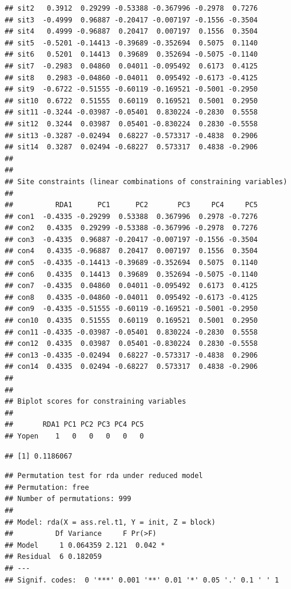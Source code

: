 \documentclass[
]{article}
\begin{document}
\begin{verbatim}
## sit2   0.3912  0.29299 -0.53388 -0.367996 -0.2978  0.7276
## sit3  -0.4999  0.96887 -0.20417 -0.007197 -0.1556 -0.3504
## sit4   0.4999 -0.96887  0.20417  0.007197  0.1556  0.3504
## sit5  -0.5201 -0.14413 -0.39689 -0.352694  0.5075  0.1140
## sit6   0.5201  0.14413  0.39689  0.352694 -0.5075 -0.1140
## sit7  -0.2983  0.04860  0.04011 -0.095492  0.6173  0.4125
## sit8   0.2983 -0.04860 -0.04011  0.095492 -0.6173 -0.4125
## sit9  -0.6722 -0.51555 -0.60119 -0.169521 -0.5001 -0.2950
## sit10  0.6722  0.51555  0.60119  0.169521  0.5001  0.2950
## sit11 -0.3244 -0.03987 -0.05401  0.830224 -0.2830  0.5558
## sit12  0.3244  0.03987  0.05401 -0.830224  0.2830 -0.5558
## sit13 -0.3287 -0.02494  0.68227 -0.573317 -0.4838  0.2906
## sit14  0.3287  0.02494 -0.68227  0.573317  0.4838 -0.2906
## 
## 
## Site constraints (linear combinations of constraining variables)
## 
##          RDA1      PC1      PC2       PC3     PC4     PC5
## con1  -0.4335 -0.29299  0.53388  0.367996  0.2978 -0.7276
## con2   0.4335  0.29299 -0.53388 -0.367996 -0.2978  0.7276
## con3  -0.4335  0.96887 -0.20417 -0.007197 -0.1556 -0.3504
## con4   0.4335 -0.96887  0.20417  0.007197  0.1556  0.3504
## con5  -0.4335 -0.14413 -0.39689 -0.352694  0.5075  0.1140
## con6   0.4335  0.14413  0.39689  0.352694 -0.5075 -0.1140
## con7  -0.4335  0.04860  0.04011 -0.095492  0.6173  0.4125
## con8   0.4335 -0.04860 -0.04011  0.095492 -0.6173 -0.4125
## con9  -0.4335 -0.51555 -0.60119 -0.169521 -0.5001 -0.2950
## con10  0.4335  0.51555  0.60119  0.169521  0.5001  0.2950
## con11 -0.4335 -0.03987 -0.05401  0.830224 -0.2830  0.5558
## con12  0.4335  0.03987  0.05401 -0.830224  0.2830 -0.5558
## con13 -0.4335 -0.02494  0.68227 -0.573317 -0.4838  0.2906
## con14  0.4335  0.02494 -0.68227  0.573317  0.4838 -0.2906
## 
## 
## Biplot scores for constraining variables
## 
##       RDA1 PC1 PC2 PC3 PC4 PC5
## Yopen    1   0   0   0   0   0
\end{verbatim}

\begin{verbatim}
## [1] 0.1186067
\end{verbatim}

\begin{verbatim}
## Permutation test for rda under reduced model
## Permutation: free
## Number of permutations: 999
## 
## Model: rda(X = ass.rel.t1, Y = init, Z = block)
##          Df Variance     F Pr(>F)  
## Model     1 0.064359 2.121  0.042 *
## Residual  6 0.182059               
## ---
## Signif. codes:  0 '***' 0.001 '**' 0.01 '*' 0.05 '.' 0.1 ' ' 1
\end{verbatim}
\end{document}
